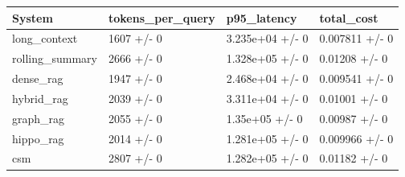\begin{tabular}{llll}
System & tokens_per_query & p95_latency & total_cost \\
\hline
long\_context & 1607 +/- 0 & 3.235e+04 +/- 0 & 0.007811 +/- 0 \\
rolling\_summary & 2666 +/- 0 & 1.328e+05 +/- 0 & 0.01208 +/- 0 \\
dense\_rag & 1947 +/- 0 & 2.468e+04 +/- 0 & 0.009541 +/- 0 \\
hybrid\_rag & 2039 +/- 0 & 3.311e+04 +/- 0 & 0.01001 +/- 0 \\
graph\_rag & 2055 +/- 0 & 1.35e+05 +/- 0 & 0.00987 +/- 0 \\
hippo\_rag & 2014 +/- 0 & 1.281e+05 +/- 0 & 0.009966 +/- 0 \\
csm & 2807 +/- 0 & 1.282e+05 +/- 0 & 0.01182 +/- 0 \\
\end{tabular}
